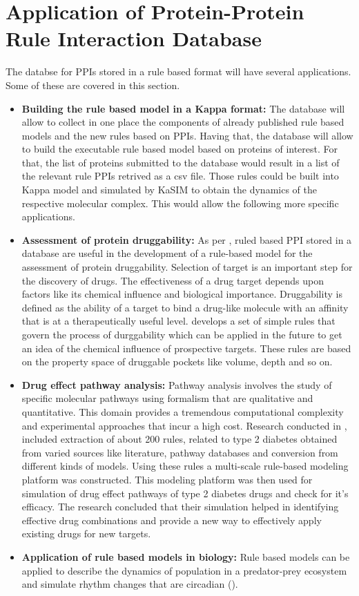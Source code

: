 \documentclass[msc,deptreport,ai]{infthesis}      %
\begin{document}
\section{Application of Protein-Protein Rule Interaction Database}
The databse for PPIs stored in a rule based format will have several applications. Some of these are covered in this section.
\begin{itemize}
	\item
	\textbf{Building the rule based model in a Kappa format:} The database will allow to collect in one place the components of already published rule based models and the new rules based on PPIs. Having that, the database will allow to build the executable rule based model based on proteins of interest. For that, the list of proteins submitted to the database would result in a list of the relevant rule PPIs retrived as a csv file. Those rules could be built into Kappa model and simulated by KaSIM to obtain the dynamics of the respective molecular complex. This would allow the following more specific applications.
	\item
	\textbf{Assessment of protein druggability:} As per \cite{druggability}, ruled based PPI stored in a database are useful in the development of a rule-based model for the assessment of protein druggability. Selection of target is an important step for the discovery of drugs. The effectiveness of a drug target depends upon factors like  its chemical influence and biological importance. Druggability is defined as the ability of a target to bind a drug-like molecule with an affinity that is at a therapeutically useful level. \cite{druggability} develops a set of simple rules that govern the process of durggability which can be applied in the future to get an idea of the chemical influence of prospective targets. These rules are based on the property space of druggable pockets like volume, depth and so on.
	\item 
	\textbf{Drug effect pathway analysis:} Pathway analysis involves the study of specific molecular pathways using formalism that are qualitative and quantitative. This domain provides a tremendous computational complexity and experimental approaches that incur a high cost. Research conducted in \cite{ruleMultiscale}, included extraction of about 200 rules, related to type 2 diabetes obtained from varied sources like literature, pathway databases and conversion from different kinds of models. Using these rules \cite{ruleMultiscale} a multi-scale rule-based modeling platform was constructed. This modeling platform was then used for simulation of drug effect pathways of type 2 diabetes drugs and check for it's efficacy. The research concluded that their simulation helped in identifying effective drug combinations and provide a new way to effectively apply existing drugs for new targets.
	\item
	\textbf{Application of rule based models in biology:} Rule based models can be applied to describe the dynamics of population in a predator-prey ecosystem and simulate rhythm changes that are circadian (\cite{rule_based}).
\end{itemize}
\end{document}
